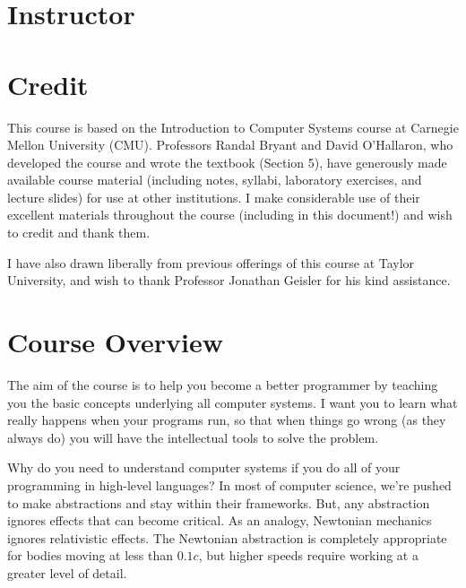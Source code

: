 \documentclass[11pt]{article}
\begin{document}
\section{Instructor}



\section{Credit}
\label{sec:orgeb2acd6}
This course is based on the Introduction to Computer Systems course
at Carnegie Mellon University (CMU).
Professors Randal Bryant and David O’Hallaron,
who developed the course and wrote the textbook (Section 5),
have generously made available course material
(including notes, syllabi, laboratory exercises, and lecture slides)
for use at other institutions.
I make considerable use of their excellent materials throughout the course
(including in this document!) and wish to credit and thank them.

I have also drawn liberally from previous offerings of this course
at Taylor University,
and wish to thank Professor Jonathan Geisler for his kind assistance.

\section{Course Overview}

The aim of the course is to help you become a better programmer by teaching you
the basic concepts underlying all computer systems. I want you to learn what
really happens when your programs run, so that when things go wrong (as they
always do) you will have the intellectual tools to solve the problem.

Why do you need to understand computer systems if you do all of your
programming in high-level languages? In most of computer science, we're pushed
to make abstractions and stay within their frameworks. But, any abstraction
ignores effects that can become critical. As an analogy, Newtonian mechanics
ignores relativistic effects. The Newtonian abstraction is completely
appropriate for bodies moving at less than \(0.1c\), but higher speeds require
working at a greater level of detail.
\end{document}
